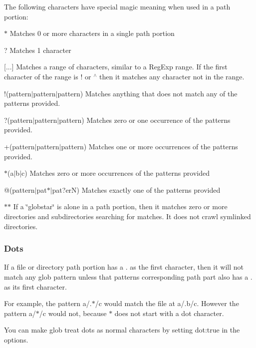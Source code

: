The following characters have special magic meaning when used in a path portion\+:


\begin{DoxyItemize}
\item {\ttfamily $\ast$} Matches 0 or more characters in a single path portion
\item {\ttfamily ?} Matches 1 character
\item {\ttfamily \mbox{[}...\mbox{]}} Matches a range of characters, similar to a Reg\+Exp range. If the first character of the range is {\ttfamily !} or {\ttfamily $^\wedge$} then it matches any character not in the range.
\item {\ttfamily !(pattern$\vert$pattern$\vert$pattern)} Matches anything that does not match any of the patterns provided.
\item {\ttfamily ?(pattern$\vert$pattern$\vert$pattern)} Matches zero or one occurrence of the patterns provided.
\item {\ttfamily +(pattern$\vert$pattern$\vert$pattern)} Matches one or more occurrences of the patterns provided.
\item {\ttfamily $\ast$(a$\vert$b$\vert$c)} Matches zero or more occurrences of the patterns provided
\item {\ttfamily @(pattern$\vert$pat$\ast$$\vert$pat?er\+N)} Matches exactly one of the patterns provided
\item {\ttfamily $\ast$$\ast$} If a \char`\"{}globstar\char`\"{} is alone in a path portion, then it matches zero or more directories and subdirectories searching for matches. It does not crawl symlinked directories.
\end{DoxyItemize}

\subsubsection*{Dots}

If a file or directory path portion has a {\ttfamily .} as the first character, then it will not match any glob pattern unless that pattern\textquotesingle{}s corresponding path part also has a {\ttfamily .} as its first character.

For example, the pattern {\ttfamily a/.$\ast$/c} would match the file at {\ttfamily a/.b/c}. However the pattern {\ttfamily a/$\ast$/c} would not, because {\ttfamily $\ast$} does not start with a dot character.

You can make glob treat dots as normal characters by setting {\ttfamily dot\+:true} in the options.

